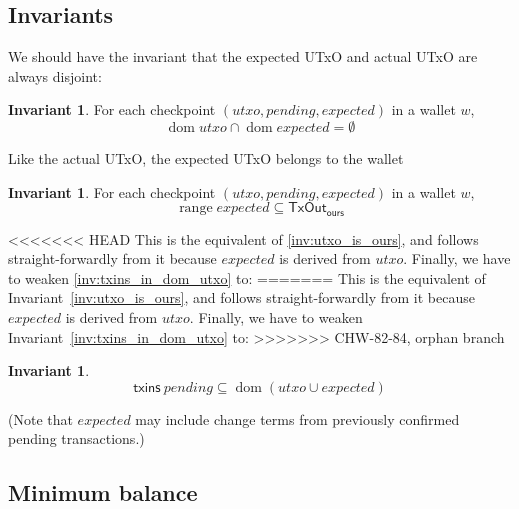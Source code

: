 \documentclass{article}
\DeclareMathOperator{\dom}{dom}
\DeclareMathOperator{\range}{range}
\theoremstyle{definition}{
  \newtheorem{lemma}{Lemma}[section] %
  \newtheorem{definition}[lemma]{Definition}
}
\theoremstyle{theorem}{
  \newtheorem{invariant}[lemma]{Invariant}
  \newtheorem{proofobligation}[lemma]{Proof Obligation}
}
\newtheorem{invariant}[lemma]{Invariant}
\numberwithin{equation}{lemma}
\begin{document}
\subsection{Invariants}

We should have the invariant that the expected UTxO and actual UTxO are always
disjoint:

\begin{invariant}
For each checkpoint $(\mathit{utxo}, \mathit{pending}, \mathit{expected})$ in a wallet $w$,
\begin{equation*}
\dom \mathit{utxo} \cap \dom \mathit{expected} = \emptyset
\end{equation*}
\end{invariant}

Like the actual UTxO, the expected UTxO belongs to the wallet

\begin{invariant}
For each checkpoint $(\mathit{utxo}, \mathit{pending}, \mathit{expected})$ in a wallet $w$,
\begin{equation*}
\range \mathit{expected} \subseteq \mathsf{TxOut}_\mathsf{ours}
\end{equation*}
\end{invariant}

<<<<<<< HEAD
This is the equivalent of \cref{inv:utxo_is_ours}, and follows
straight-forwardly from it because $\mathit{expected}$ is derived from
$\mathit{utxo}$. Finally, we have to weaken
\cref{inv:txins_in_dom_utxo} to:
=======
This is the equivalent of Invariant~\ref{inv:utxo_is_ours}, and follows
straight-forwardly from it because $\mathit{expected}$ is derived from
$\mathit{utxo}$. Finally, we have to weaken
Invariant~\ref{inv:txins_in_dom_utxo} to:
>>>>>>> CHW-82-84, orphan branch

\begin{invariant}
\begin{equation*}
\mathsf{txins} ~ \mathit{pending} \subseteq \dom (\mathit{utxo} \cup \mathit{expected})
\end{equation*}
\label{inv:txins_in_dom_utxo_expected_pending}
\end{invariant}

(Note that $\mathit{expected}$ may include change terms from previously
confirmed pending transactions.)

\subsection{Minimum balance}
\end{document}
